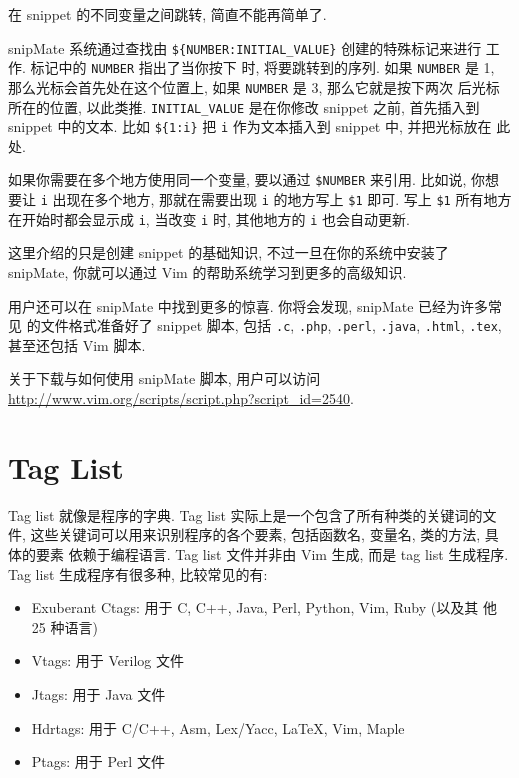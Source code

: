 在 snippet 的不同变量之间跳转, 简直不能再简单了.

snipMate 系统通过查找由 \texttt{\$\{NUMBER:INITIAL\_VALUE\}} 创建的特殊标记来进行
工作. 标记中的 \texttt{NUMBER} 指出了当你按下  时, 将要跳转到的序列.
如果 \texttt{NUMBER} 是 1, 那么光标会首先处在这个位置上, 如果 \texttt{NUMBER} 
是 3, 那么它就是按下两次  后光标所在的位置, 以此类推.
\texttt{INITIAL\_VALUE} 是在你修改 snippet 之前, 首先插入到 snippet 中的文本.
比如 \texttt{\$\{1:i\}} 把 \texttt{i} 作为文本插入到 snippet 中, 并把光标放在
此处.

如果你需要在多个地方使用同一个变量, 要以通过 \texttt{\$NUMBER} 来引用. 比如说,
你想要让 \texttt{i} 出现在多个地方, 那就在需要出现 \texttt{i} 的地方写上
\texttt{\$1} 即可. 写上 \texttt{\$1} 所有地方在开始时都会显示成 \texttt{i},
当改变 \texttt{i} 时, 其他地方的 \texttt{i} 也会自动更新.

这里介绍的只是创建 snippet 的基础知识, 不过一旦在你的系统中安装了 snipMate,
你就可以通过 Vim 的帮助系统学习到更多的高级知识.

用户还可以在 snipMate 中找到更多的惊喜. 你将会发现, snipMate 已经为许多常见
的文件格式准备好了 snippet 脚本, 包括 \texttt{.c}, \texttt{.php},
\texttt{.perl}, \texttt{.java}, \texttt{.html}, \texttt{.tex}, 甚至还包括 Vim 
脚本.

\begin{warning}
    关于下载与如何使用 snipMate 脚本, 用户可以访问
    \url{http://www.vim.org/scripts/script.php?script_id=2540}.
\end{warning}

\section{Tag List}
\label{sec:using_tag_list}

Tag list 就像是程序的字典. Tag list 实际上是一个包含了所有种类的关键词的文件,
这些关键词可以用来识别程序的各个要素, 包括函数名, 变量名, 类的方法, 具体的要素
依赖于编程语言. Tag list 文件并非由 Vim 生成, 而是 tag list 生成程序. Tag list
生成程序有很多种, 比较常见的有:
\begin{itemize}
    \item Exuberant Ctags: 用于 C, C++, Java, Perl, Python, Vim, Ruby (以及其
        他 25 种语言)
    \item Vtags: 用于 Verilog 文件
    \item Jtags: 用于 Java 文件
    \item Hdrtags: 用于 C/C++, Asm, Lex/Yacc, LaTeX, Vim, Maple
    \item Ptags: 用于 Perl 文件
\end{itemize}

